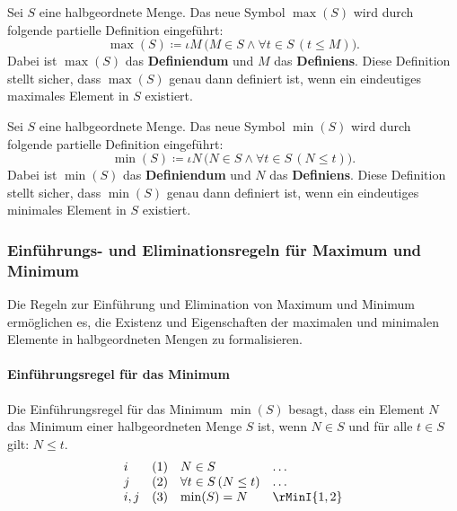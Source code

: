 \documentclass[main.tex]{subfiles}
\begin{document}
\begin{definition}[Maximum]
    Sei \( S \) eine halbgeordnete Menge. Das neue Symbol \(\max(S)\) wird durch folgende partielle Definition eingeführt:
    \[
    \max(S) \coloneqq \iota M \, \big(M \in S \land \forall t \in S \, (t \leq M)\big).
    \]
    Dabei ist \(\max(S)\) das \textbf{Definiendum} und \( M \) das \textbf{Definiens}. Diese Definition stellt sicher, dass \(\max(S)\) genau dann definiert ist, wenn ein eindeutiges maximales Element in \( S \) existiert.
\end{definition}

\begin{definition}[Minimum]
    Sei \( S \) eine halbgeordnete Menge. Das neue Symbol \(\min(S)\) wird durch folgende partielle Definition eingeführt:
    \[
    \min(S) \coloneqq \iota N \, \big(N \in S \land \forall t \in S \, (N \leq t)\big).
    \]
    Dabei ist \(\min(S)\) das \textbf{Definiendum} und \( N \) das \textbf{Definiens}. Diese Definition stellt sicher, dass \(\min(S)\) genau dann definiert ist, wenn ein eindeutiges minimales Element in \( S \) existiert.
\end{definition}

\subsubsection{Einführungs- und Eliminationsregeln für Maximum und Minimum}
\label{rule:rMaxI} \label{rule:rMaxE} \label{rule:rMinI} \label{rule:rMinE}

Die Regeln zur Einführung und Elimination von Maximum und Minimum ermöglichen es, die Existenz und Eigenschaften der maximalen und minimalen Elemente in halbgeordneten Mengen zu formalisieren.

\paragraph{Einführungsregel für das Minimum}
Die Einführungsregel für das Minimum \(\min(S)\) besagt, dass ein Element \(N\) das Minimum einer halbgeordneten Menge \(S\) ist, wenn \(N \in S\) und für alle \(t \in S\) gilt: \(N \leq t\).
\[
\begin{array}{llll}
    i   & (1) & N \in S & \dots \\
    j   & (2) & \forall t \in S \, (N \leq t) & \dots \\
    i,j & (3) & \min(S) = N & \rMinI{1,2}
\end{array}
\]
\end{document}
